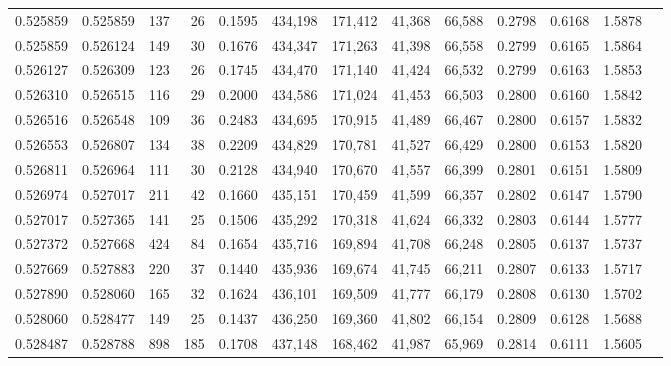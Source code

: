 \begin{tabular}{rrrrrrrrrrrrr}
0.525859 & 0.525859 &   137 &  26 &                                     0.1595 & 434,198 & 171,412 &  41,368 &  66,588 & 0.2798 & 0.6168 & 1.5878 \\
0.525859 & 0.526124 &   149 &  30 &                                     0.1676 & 434,347 & 171,263 &  41,398 &  66,558 & 0.2799 & 0.6165 & 1.5864 \\
0.526127 & 0.526309 &   123 &  26 &                                     0.1745 & 434,470 & 171,140 &  41,424 &  66,532 & 0.2799 & 0.6163 & 1.5853 \\
0.526310 & 0.526515 &   116 &  29 &                                     0.2000 & 434,586 & 171,024 &  41,453 &  66,503 & 0.2800 & 0.6160 & 1.5842 \\
0.526516 & 0.526548 &   109 &  36 &                                     0.2483 & 434,695 & 170,915 &  41,489 &  66,467 & 0.2800 & 0.6157 & 1.5832 \\
0.526553 & 0.526807 &   134 &  38 &                                     0.2209 & 434,829 & 170,781 &  41,527 &  66,429 & 0.2800 & 0.6153 & 1.5820 \\
0.526811 & 0.526964 &   111 &  30 &                                     0.2128 & 434,940 & 170,670 &  41,557 &  66,399 & 0.2801 & 0.6151 & 1.5809 \\
0.526974 & 0.527017 &   211 &  42 &                                     0.1660 & 435,151 & 170,459 &  41,599 &  66,357 & 0.2802 & 0.6147 & 1.5790 \\
0.527017 & 0.527365 &   141 &  25 &                                     0.1506 & 435,292 & 170,318 &  41,624 &  66,332 & 0.2803 & 0.6144 & 1.5777 \\
0.527372 & 0.527668 &   424 &  84 &                                     0.1654 & 435,716 & 169,894 &  41,708 &  66,248 & 0.2805 & 0.6137 & 1.5737 \\
0.527669 & 0.527883 &   220 &  37 &                                     0.1440 & 435,936 & 169,674 &  41,745 &  66,211 & 0.2807 & 0.6133 & 1.5717 \\
0.527890 & 0.528060 &   165 &  32 &                                     0.1624 & 436,101 & 169,509 &  41,777 &  66,179 & 0.2808 & 0.6130 & 1.5702 \\
0.528060 & 0.528477 &   149 &  25 &                                     0.1437 & 436,250 & 169,360 &  41,802 &  66,154 & 0.2809 & 0.6128 & 1.5688 \\
0.528487 & 0.528788 &   898 & 185 &                                     0.1708 & 437,148 & 168,462 &  41,987 &  65,969 & 0.2814 & 0.6111 & 1.5605 \\

\end{tabular}
